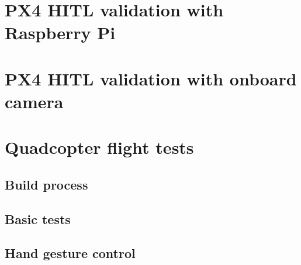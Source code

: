 
\section{PX4 HITL validation with Raspberry Pi}
\label{sec:test-5-rpi}


\section{PX4 HITL validation with onboard camera}
\label{sec:test-6-onboardcam}


\section{Quadcopter flight tests}

\subsection{Build process}
\label{sec:test-7-builddrone}


\subsection{Basic tests}
\label{sec:test-8-flight}


\subsection{Hand gesture control}
\label{sec:test-9-hand}

